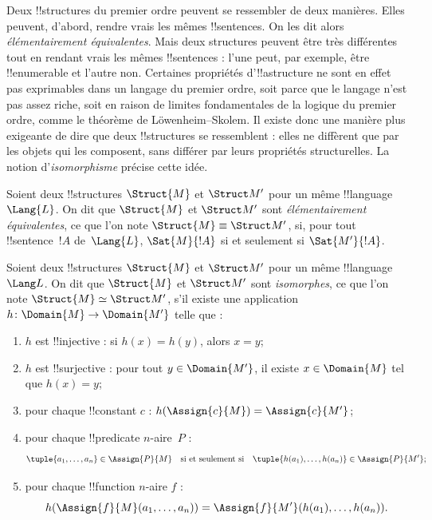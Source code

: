\documentclass[../../../include/open-logic-section]{subfiles}
\begin{document}

Deux !!{structure}s du premier ordre peuvent se ressembler de deux
manières. Elles peuvent, d'abord, rendre vrais les mêmes !!{sentence}s.
On les dit alors \emph{élémentairement équivalentes}. Mais deux
structures peuvent être très différentes tout en rendant vrais les
mêmes !!{sentence}s : l'une peut, par exemple, être !!{enumerable}
et l'autre non. Certaines propriétés d'!!a{structure} ne sont en effet
pas exprimables dans un langage du premier ordre, soit parce que le
langage n'est pas assez riche, soit en raison de limites fondamentales
de la logique du premier ordre, comme le théorème de
L\"owenheim--Skolem. Il existe donc une manière plus exigeante de
dire que deux !!{structure}s se ressemblent : elles ne diffèrent que
par les objets qui les composent, sans différer par leurs propriétés
structurelles. La notion d'\emph{isomorphisme} précise cette idée.

\begin{defn}
Soient deux !!{structure}s $\Struct{M}$ et $\Struct M'$ pour un même
!!{language}~$\Lang{L}$. On dit que $\Struct{M}$ et $\Struct M'$ sont
\emph{élémentairement équivalentes}, ce que l'on note
$\Struct{M} \equiv \Struct M'$, si, pour tout !!{sentence}~$!A$
de~$\Lang{L}$, $\Sat{M}{!A}$ si et seulement si $\Sat{M'}{!A}$.
\end{defn}

\begin{defn}
 Soient deux !!{structure}s $\Struct{M}$ et
$\Struct M'$ pour un même !!{language}~$\Lang L$. On dit que
$\Struct{M}$ et $\Struct M'$ sont \emph{isomorphes}, ce que l'on note
$\Struct{M} \simeq \Struct M'$, s'il existe une application
$h \colon \Domain{M} \to \Domain{M'}$ telle que :
\begin{enumerate}
\item $h$ est !!{injective} : si $h(x) =
  h(y)$, alors $x = y$;
\item $h$ est !!{surjective} : pour tout $y \in \Domain{M'}$, il
  existe $x \in \Domain{M}$ tel que $h(x) = y$;
\item {}pour chaque !!{constant} $c$ :
  $h(\Assign{c}{M}) = \Assign{c}{M'}$;
\item {}pour chaque !!{predicate} $n$-aire~$P$ :
  \[
  \tuple{a_1, \dots, a_n}\in \Assign{P}{M} \quad\text{si et seulement si}\quad
  \tuple{h(a_1), \dots, h(a_n)} \in \Assign{P}{M'};
  \]
\item {}pour chaque !!{function} $n$-aire $f$ :
  \[
  h(\Assign{f}{M}(a_1, \dots, a_n)) =
  \Assign{f}{M'}(h(a_1), \dots, h(a_n)).
  \]
\end{enumerate}
\end{defn}
\end{document}
